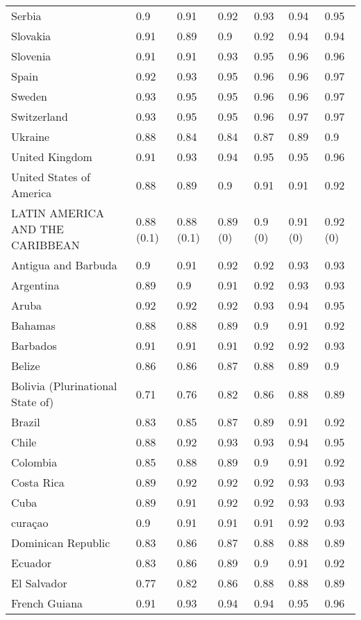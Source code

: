 \begin{longtable}[t]{lllllll}
Serbia & 0.9 & 0.91 & 0.92 & 0.93 & 0.94 & 0.95\\
Slovakia & 0.91 & 0.89 & 0.9 & 0.92 & 0.94 & 0.94\\
Slovenia & 0.91 & 0.91 & 0.93 & 0.95 & 0.96 & 0.96\\
Spain & 0.92 & 0.93 & 0.95 & 0.96 & 0.96 & 0.97\\
Sweden & 0.93 & 0.95 & 0.95 & 0.96 & 0.96 & 0.97\\
Switzerland & 0.93 & 0.95 & 0.95 & 0.96 & 0.97 & 0.97\\
Ukraine & 0.88 & 0.84 & 0.84 & 0.87 & 0.89 & 0.9\\
United Kingdom & 0.91 & 0.93 & 0.94 & 0.95 & 0.95 & 0.96\\
United States of America & 0.88 & 0.89 & 0.9 & 0.91 & 0.91 & 0.92\\
LATIN AMERICA AND THE CARIBBEAN & 0.88 (0.1) & 0.88 (0.1) & 0.89 (0) & 0.9 (0) & 0.91 (0) & 0.92 (0)\\
Antigua and Barbuda & 0.9 & 0.91 & 0.92 & 0.92 & 0.93 & 0.93\\
Argentina & 0.89 & 0.9 & 0.91 & 0.92 & 0.93 & 0.93\\
Aruba & 0.92 & 0.92 & 0.92 & 0.93 & 0.94 & 0.95\\
Bahamas & 0.88 & 0.88 & 0.89 & 0.9 & 0.91 & 0.92\\
Barbados & 0.91 & 0.91 & 0.91 & 0.92 & 0.92 & 0.93\\
Belize & 0.86 & 0.86 & 0.87 & 0.88 & 0.89 & 0.9\\
Bolivia (Plurinational State of) & 0.71 & 0.76 & 0.82 & 0.86 & 0.88 & 0.89\\
Brazil & 0.83 & 0.85 & 0.87 & 0.89 & 0.91 & 0.92\\
Chile & 0.88 & 0.92 & 0.93 & 0.93 & 0.94 & 0.95\\
Colombia & 0.85 & 0.88 & 0.89 & 0.9 & 0.91 & 0.92\\
Costa Rica & 0.89 & 0.92 & 0.92 & 0.92 & 0.93 & 0.93\\
Cuba & 0.89 & 0.91 & 0.92 & 0.92 & 0.93 & 0.93\\
curaçao & 0.9 & 0.91 & 0.91 & 0.91 & 0.92 & 0.93\\
Dominican Republic & 0.83 & 0.86 & 0.87 & 0.88 & 0.88 & 0.89\\
Ecuador & 0.83 & 0.86 & 0.89 & 0.9 & 0.91 & 0.92\\
El Salvador & 0.77 & 0.82 & 0.86 & 0.88 & 0.88 & 0.89\\
French Guiana & 0.91 & 0.93 & 0.94 & 0.94 & 0.95 & 0.96\\

\end{longtable}
